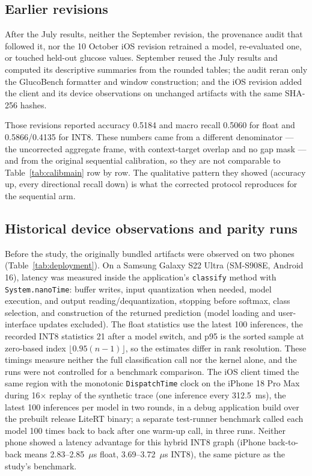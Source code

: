 \documentclass[10pt,twocolumn]{article}
\begin{document}
\subsection{Earlier revisions}

After the July results, neither the September revision, the provenance
audit that followed it, nor the 10 October iOS revision retrained a model,
re-evaluated one, or touched held-out glucose values. September reused the
July results and computed its descriptive summaries from the rounded
tables; the audit reran only the GlucoBench formatter and window
construction; and the iOS revision added the client and its device
observations on unchanged artifacts with the same SHA-256 hashes.

Those revisions reported accuracy 0.5184 and macro recall 0.5060 for
float and 0.5866/0.4135 for INT8. These numbers came from a different
denominator --- the uncorrected aggregate frame, with context-target
overlap and no gap mask --- and from the original sequential calibration,
so they are not comparable to Table~\ref{tab:calibmain} row by row. The
qualitative pattern they showed (accuracy up, every directional recall
down) is what the corrected protocol reproduces for the sequential arm.

\subsection{Historical device observations and parity runs}

Before the study, the originally bundled artifacts were observed on two
phones (Table~\ref{tab:deployment}). On a Samsung Galaxy S22 Ultra
(SM-S908E, Android 16), latency was measured inside the application's
\texttt{classify} method with \texttt{System.nanoTime}: buffer writes,
input quantization when needed, model execution, and output
reading/dequantization, stopping before softmax, class selection, and
construction of the returned prediction (model loading and user-interface
updates excluded). The float statistics use the latest 100 inferences, the
recorded INT8 statistics 21 after a model switch, and p95 is the sorted
sample at zero-based index $\lfloor0.95(n-1)\rfloor$, so the estimates
differ in rank resolution. These timings measure neither the full
classification call nor the kernel alone, and the runs were not controlled
for a benchmark comparison. The iOS client timed the same region with the
monotonic \texttt{DispatchTime} clock on the iPhone 18 Pro Max during
16$\times$ replay of the synthetic trace (one inference every 312.5~ms),
the latest 100 inferences per model in two rounds, in a debug application
build over the prebuilt release LiteRT binary; a separate test-runner
benchmark called each model 100 times back to back after one warm-up call,
in three runs. Neither phone showed a latency advantage for this hybrid
INT8 graph (iPhone
back-to-back means 2.83--2.85~$\mu$s float, 3.69--3.72~$\mu$s INT8), the
same picture as the study's benchmark.
\end{document}
